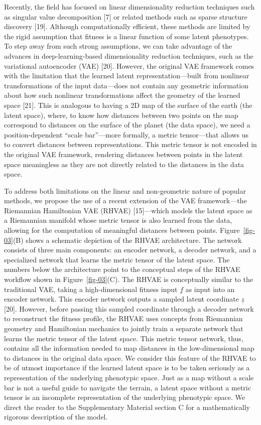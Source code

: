 \documentclass[
]{scrartcl}
\begin{document}
\begin{refsegment}
Recently, the field has focused on linear dimensionality reduction
techniques such as singular value decomposition {[}7{]} or related
methods such as sparse structure discovery {[}19{]}. Although
computationally efficient, these methods are limited by the rigid
assumption that fitness is a linear function of some latent phenotypes.
To step away from such strong assumptions, we can take advantage of the
advances in deep-learning-based dimensionality reduction techniques,
such as the variational autoencoder (VAE) {[}20{]}. However, the
original VAE framework comes with the limitation that the learned latent
representation---built from nonlinear transformations of the input
data---does not contain any geometric information about how such
nonlinear transformations affect the geometry of the learned space
{[}21{]}. This is analogous to having a 2D map of the surface of the
earth (the latent space), where, to know how distances between two
points on the map correspond to distances on the surface of the planet
(the data space), we need a position-dependent ``scale bar''---more
formally, a metric tensor---that allows us to convert distances between
representations. This metric tensor is not encoded in the original VAE
framework, rendering distances between points in the latent space
meaningless as they are not directly related to the distances in the
data space.

To address both limitations on the linear and non-geometric nature of
popular methods, we propose the use of a recent extension of the VAE
framework---the Riemannian Hamiltonian VAE (RHVAE) {[}15{]}---which
models the latent space as a Riemannian manifold whose metric tensor is
also learned from the data, allowing for the computation of meaningful
distances between points. Figure~\ref{fig-03}(B) shows a schematic
depiction of the RHVAE architecture. The network consists of three main
components: an encoder network, a decoder network, and a specialized
network that learns the metric tensor of the latent space. The numbers
below the architecture point to the conceptual steps of the RHVAE
workflow shown in Figure~\ref{fig-03}(C). The RHVAE is conceptually
similar to the traditional VAE, taking a high-dimensional fitness input
\(\underline{f}\) as input into an encoder network. This encoder network
outputs a sampled latent coordinate \(\underline{z}\) {[}20{]}. However,
before passing this sampled coordinate through a decoder network to
reconstruct the fitness profile, the RHVAE uses concepts from Riemannian
geometry and Hamiltonian mechanics to jointly train a separate network
that learns the metric tensor of the latent space. This metric tensor
network, thus, contains all the information needed to map distances in
the low-dimensional map to distances in the original data space. We
consider this feature of the RHVAE to be of utmost importance if the
learned latent space is to be taken seriously as a representation of the
underlying phenotypic space. Just as a map without a scale bar is not a
useful guide to navigate the terrain, a latent space without a metric
tensor is an incomplete representation of the underlying phenotypic
space. We direct the reader to the Supplementary Material section C for
a mathematically rigorous description of the model.


\end{refsegment}
\end{document}
